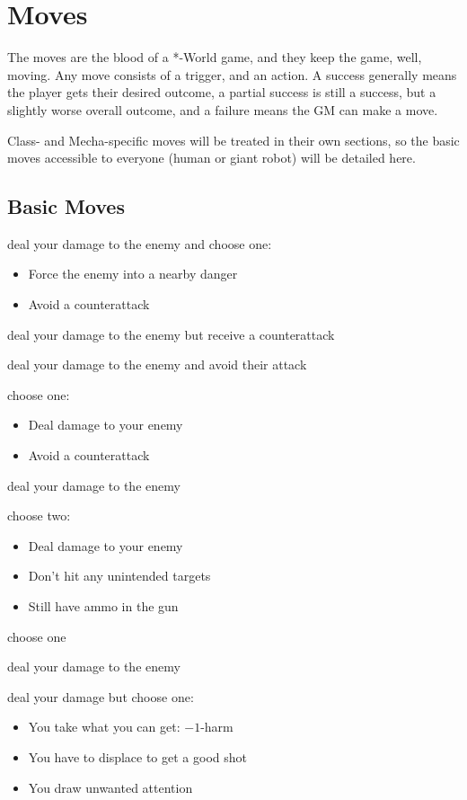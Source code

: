 \section{Moves}
The moves are the blood of a *-World game, and they keep the game, well, moving. Any move consists of a trigger, and an action. A success generally means the player gets their desired outcome, a partial success is still a success, but a slightly worse overall outcome, and a failure means the GM can make a move.

Class- and Mecha-specific moves will be treated in their own sections, so the basic moves accessible to everyone (human or giant robot) will be detailed here.

\subsection{Basic Moves}

{deal your damage to the enemy and choose one:
\begin{itemize}
\item Force the enemy into a nearby danger
\item Avoid a counterattack
\end{itemize}}
{deal your damage to the enemy but receive a counterattack}

{deal your damage to the enemy and avoid their attack}
{choose one:
\begin{itemize}
\item Deal damage to your enemy
\item Avoid a counterattack
\end{itemize}}

{deal your damage to the enemy}
{choose two:
\begin{itemize}
\item Deal damage to your enemy
\item Don't hit any unintended targets
\item Still have ammo in the gun
\end{itemize}}
{choose one}

{deal your damage to the enemy}
{deal your damage but choose one:
\begin{itemize}
\item You take what you can get: $-1$-harm
\item You have to displace to get a good shot
\item You draw unwanted attention
\end{itemize}}


